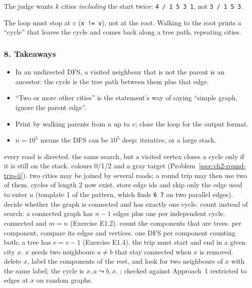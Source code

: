 \begin{warningbox}
The judge wants $k$ cities \emph{including} the start twice: \texttt{4 / 1 5 3 1}, not \texttt{3 / 1 5 3}.
\end{warningbox}

\begin{warningbox}
The loop must stop at $v$ (\texttt{x != v}), not at the root. Walking to the root prints a ``cycle'' that leaves the cycle and comes back along a tree path, repeating cities.
\end{warningbox}

\subsubsection*{8. Takeaways}

\begin{itemize}[leftmargin=*]
    \item In an undirected DFS, a visited neighbour that is not the parent is an ancestor: the cycle is the tree path between them plus that edge.
    \item ``Two or more other cities'' is the statement's way of saying ``simple graph, ignore the parent edge''.
    \item Print by walking parents from $u$ up to $v$; close the loop for the output format.
    \item $n = 10^5$ means the DFS can be $10^5$ deep: iterative, or a large stack.
\end{itemize}

\begin{variantsbox}
  {every road is directed.}
  {the same search, but a visited vertex closes a cycle only if it is still on the stack.}
  {colours 0/1/2 and a gray target (Problem~\ref{ssec:ch2-round-trip-ii}).}
  {two cities may be joined by several roads; a round trip may then use two of them.}
  {cycles of length 2 now exist.}
  {store edge ids and skip only the edge used to enter $u$ (template 1 of the pattern, which finds \texttt{6 7} on two parallel edges).}
  {decide whether the graph is connected and has exactly one cycle.}
  {count instead of search: a connected graph has $n - 1$ edges plus one per independent cycle.}
  {connected and $m = n$ (Exercise E1.2).}
  {count the components that are trees.}
  {per component, compare its edges and vertices.}
  {one DFS per component counting both; a tree has $e = v - 1$ (Exercise E1.4).}
  {the trip must start and end in a given city $x$.}
  {$x$ needs two neighbours $a \ne b$ that stay connected when $x$ is removed.}
  {delete $x$, label the components of the rest, and look for two neighbours of $x$ with the same label; the cycle is $x, a \leadsto b, x$. ; checked against Approach~1 restricted to edges at $x$ on random graphs.}
\end{variantsbox}
